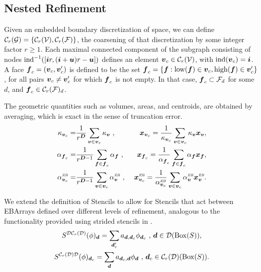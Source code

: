 \documentclass[12pt]{article}
\newcommand{\ind}{{\rm{ind}}}
\newcommand{\low}{{\rm{low}}}
\newcommand{\high}{{\rm{high}}}
\newcommand{\vof}{{\mbf{v}}}
\newcommand{\face}{{\mbf{f}}}
\newcommand{\dgen}{{\mbf{d}}}
\newcommand{\VC}{{\mcl{C}_r(\mcl{V})}}
\newcommand{\ebsub}{{\text{\it \tiny EB}}}
\begin{document}
\subsection{Nested Refinement} 

Given an embedded boundary discretization of space, we can define ${\mathcal{C}}_r({\mathcal{G}}) =\{ {\mathcal{C}}_r({\mathcal{V}}),{\mathcal{C}}_r({\mathcal{F}})\}$, the coarsening of that discretization by some integer factor $r \ge 1$. Each maximal connected component of the subgraph consisting of nodes $\ind^{-1}([\mbf{i} r , (\mbf{i} + \mbf{u})r - \mbf{u}] )$ defines an element $\vof_c \in \VC$, with $\ind(\vof_c) = \mbf{i}$. A face $\face_c = (\vof_c , \vof_c')$ is defined to be the set $\face_c = \{\face: \low(\face ) \in \vof_c , \high(\face) \in \vof_c'\}$, for all pairs $\vof_c \neq \vof_c'$ for which $\face_c$ is not empty. In that case, $\face_c \subset \mcl{F}_d$ for some $d$, and $\face_c \in \mcl{C}_r(\mcl{F})_d$.

The geometric quantities such as volumes, areas, and centroids, are obtained by averaging, which is exact in the sense of truncation error. 
\begin{align*}
\kappa_{\vof_c} = & \frac{1}{r^\DIM} \sum \limits_{\vof \in \vof_c} \kappa_\vof \cma &
\mbf{x}_{\vof_c} =  \frac{1}{\kappa_{\vof_c}} \sum \limits_{\vof \in \vof_c} \kappa_\vof \mbf{x}_\vof ,
\\
\alpha_{\face_c} = & \frac{1}{r^{\DIM-1}} \sum \limits_{\face \in \face_c} \alpha_\face \cma & \mbf{x}_{\face_c} =  \frac{1}{\alpha_{\face_c}} \sum \limits_{\face \in \face_c} \alpha_\face \mbf{x}_\face ,
\\
\alpha_{\vof_c}^\ebsub = & \frac{1}{r^{\DIM-1}} \sum \limits_{\vof \in \vof_c} \alpha_\vof^\ebsub \cma & \mbf{x}_{\vof_c}^\ebsub =  \frac{1}{\alpha_{\vof_c}^\ebsub} \sum \limits_{\vof \in \vof_c} \alpha_\vof^\ebsub \mbf{x}_\vof^\ebsub .
\end{align*}

We extend the definition of Stencils to allow for Stencils that act between EBArrays defined over different levels of refinement, analogous to the functionality provided using strided stencils in .
\begin{gather*}
S^{\mcl{D}\mcl{C}_r(\mcl{D})}(\phi)_{\dgen} =\sum \limits_{\dgen_c '} a_{\dgen,\dgen_c} \phi_{\dgen_c  } \cma \dgen \in \mcl{D}(\MBox(S)), 
\\ S^{\mcl{C}_r(\mcl{D}) \mcl{D}}(\phi)_{\dgen_c} = \sum \limits_{\dgen} a_{\dgen_c,\dgen} \phi_{\dgen} \cma \dgen_c \in \mcl{C}_r(\mcl{D})(\MBox(S)).
\end{gather*}
\end{document}
